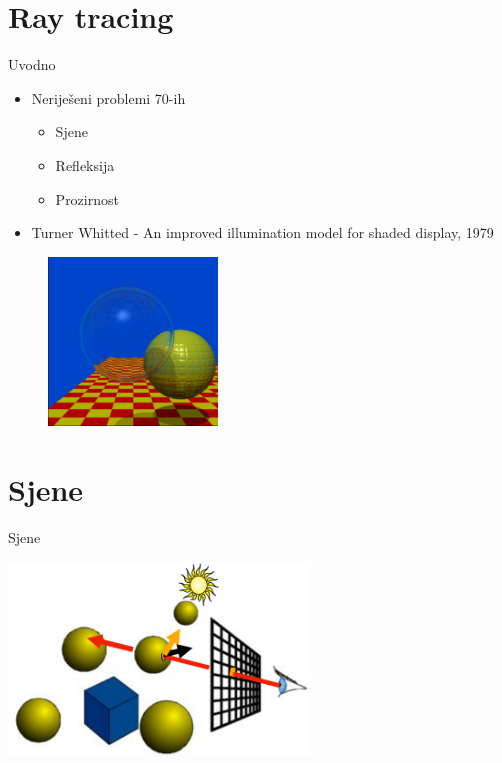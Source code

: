 \documentclass[9pt]{beamer}
\begin{document}
\section{Ray tracing}
\begin{frame}{Uvodno}
\begin{itemize}
	\item Neriješeni problemi 70-ih
	\begin{itemize}
		\item Sjene
		\item Refleksija
		\item Prozirnost
	\end{itemize}
	\item Turner Whitted - An improved illumination model for shaded display, 1979
\end{itemize}
\begin{figure}
	\includegraphics[width=0.4\textwidth]{./slike/whitted-spheres.jpg}
\end{figure}
\end{frame}

\section{Sjene}

\begin{frame}{Sjene}
\begin{center}
	\includegraphics[width=8cm]{slike/sjene_01.png}
\end{center}

\end{frame}
\end{document}
